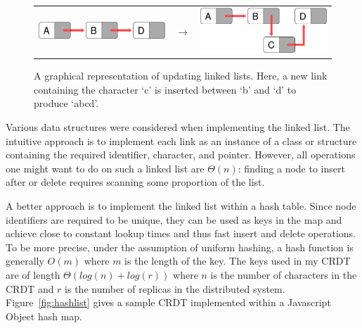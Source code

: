 \documentclass[12pt,a4paper,twoside,openright]{report}
\begin{document}
		
		\begin{figure}[htb]
		\centering
		  \begin{tabular}{ >{\centering}m{6cm} >{\centering}m{15mm} >{\centering\arraybackslash}m{6cm} }
		    \includegraphics[width=1\linewidth]{figs/linkedlist_0.eps}  &
		    $\longrightarrow$  &
		    \includegraphics[width=1\linewidth]{figs/linkedlist.eps}
		  \end{tabular}
		\caption[Updating linked lists]{A graphical representation of updating linked lists. Here, a new link containing the character `c' is inserted between `b' and `d' to produce `abcd'.}
		\label{fig:linkedlist}
		\end{figure}
		
		Various data structures were considered when implementing the linked list. The intuitive approach is to implement each link as an instance of a class or structure containing the required identifier, character, and pointer. However, all operations one might want to do on such a linked list are $\Theta (n)$: finding a node to insert after or delete requires scanning some proportion of the list.
		
		A better approach is to implement the linked list within a hash table. Since node identifiers are required to be unique, they can be used as keys in the map and achieve close to constant lookup times and thus fast insert and delete operations. To be more precise, under the assumption of uniform hashing, a hash function is generally $O(m)$ where $m$ is the length of the key. The keys used in my CRDT are of length $\Theta (log(n)+log(r))$ where $n$ is the number of characters in the CRDT and $r$ is the number of replicas in the distributed system. Figure~\ref{fig:hashlist} gives a sample CRDT implemented within a Javascript Object hash map.
		
		
		
\end{document}
